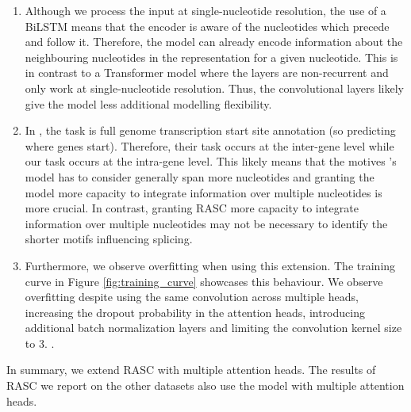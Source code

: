 \begin{enumerate}
	\item Although we process the input at single-nucleotide resolution, the use of a BiLSTM means that the encoder is aware of the nucleotides which precede and follow it. Therefore, the model can already encode information about the neighbouring nucleotides in the representation for a given nucleotide. This is in contrast to a Transformer model where the layers are non-recurrent and only work at single-nucleotide resolution. Thus, the convolutional layers likely give the model less additional modelling flexibility.
	\item In \cite{ghentransformers}, the task is full genome transcription start site annotation (so predicting where genes start). Therefore, their task occurs at the inter-gene level while our task occurs at the intra-gene level. This likely means that the motives \cite{ghentransformers}'s model has to consider generally span more nucleotides and granting the model more capacity to integrate information over multiple nucleotides is more crucial. 
	In contrast, granting RASC more capacity to integrate information over multiple nucleotides may not be necessary to identify the shorter motifs influencing splicing. 
	\item Furthermore, we observe overfitting when using this extension. The training curve in Figure \ref{fig:training_curve}
	showcases this behaviour. We observe overfitting despite using the same convolution across multiple heads, increasing the dropout probability in the attention heads, introducing additional batch normalization layers and limiting the convolution kernel size to 3.
	. 
\end{enumerate}


In summary, we extend RASC with multiple attention heads. The results of RASC we report on the other datasets also use the model with multiple attention heads. 



